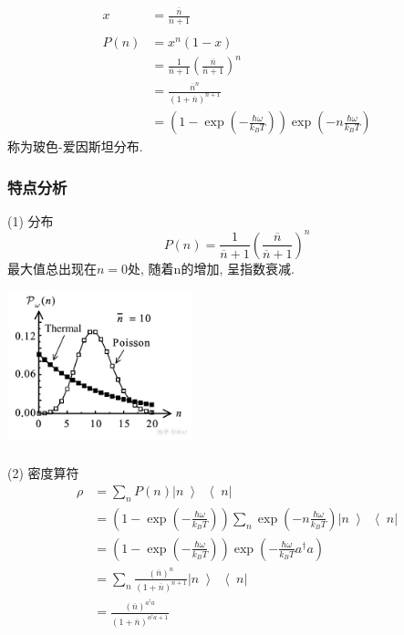 \begin{frame}
    \frametitle{}
    \[\begin{aligned}
        x & = \frac{\overline{n}}{\overline{n}+1} \\ 
        &~\\
        P(n) &= x^n (1-x) \\ 
        &=  \frac{1}{\overline{n}+1}\left( \frac{\overline{n}}{\overline{n}+1} \right)^n \\ 
        &=  \frac{\overline{n}^n}{(1+\overline{n})^{n+1}} \\ 
        &= \left( 1-\exp(-\frac{\hbar \omega}{k_B T} )
  \right) \exp(-n \frac{\hbar \omega}{k_B T}) 
      \end{aligned} \]
    称为玻色-爱因斯坦分布. \\  {\vspace*{2.3em}}
\end{frame}

\begin{frame}
 \frametitle{特点分析}
  (1) 分布
  \[ P(n) =\frac{1}{\overline{n}+1}\left( \frac{\overline{n}}{\overline{n}+1} \right)^n \]  
  最大值总出现在$n=0$处,  随着n的增加, 呈指数衰减.
    \begin{center}
         \includegraphics[width=0.4\textwidth]{figs/2022-05-06-14-46-00.png}
    \end{center}    
\end{frame}

\begin{frame}
    \frametitle{}   
    (2) 密度算符 
    \[ \begin{aligned}
        \rho &= \sum _n P(n) |n\left\rangle \right\langle n| \\
        &= \left( 1-\exp(-\frac{\hbar \omega}{k_B T} )
        \right) \sum _n \exp(-n \frac{\hbar \omega}{k_B T}) |n\left\rangle \right\langle n| \\ 
        &= \left( 1-\exp(-\frac{\hbar \omega}{k_B T} )
        \right) \exp(- \frac{\hbar \omega}{k_B T} a^{\dagger} a) \\
        &= \sum_n \frac{(\overline{n})^n}{(1+\overline{n})^{n+1}} |n\left\rangle \right\langle n| \\
        &= \frac{(\overline{n})^{a^{\dagger} a}}{(1+\overline{n})^{a^{\dagger} a+1}} 
    \end{aligned}\] 
\end{frame}

